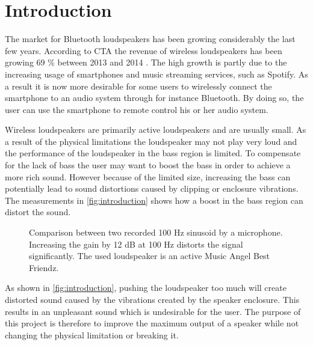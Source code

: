\chapter{Introduction}

The market for Bluetooth loudspeakers has been growing considerably the last few years. According to \gls{CTA} the revenue of wireless loudspeakers has been growing 69 \% between 2013 and 2014 \cite{sou:CTA}. The high growth is partly due to the increasing usage of smartphones and music streaming services, such as Spotify. As a result it is now more desirable for some users to wirelessly connect the smartphone to an audio system through for instance Bluetooth. By doing so, the user can use the smartphone to remote control his or her audio system. 

Wireless loudspeakers are primarily active loudspeakers and are usually small. As a result of the physical limitations the loudspeaker may not play very loud and the performance of the loudspeaker in the bass region is limited. To compensate for the lack of bass the user may want to boost the bass in order to achieve a more rich sound. However because of the limited size, increasing the bass can potentially lead to sound distortions caused by clipping or enclosure vibrations. The measurements in \autoref{fig:introduction} shows how a boost in the bass region can distort the sound.

\begin{figure}[H]
\centering
{}

\caption{Comparison between two recorded 100 Hz sinusoid by a microphone. Increasing the gain by 12 dB at 100 Hz distorts the signal significantly. The used loudspeaker is an active Music Angel Best Friendz.}
\label{fig:introduction}
\end{figure}
As shown in \autoref{fig:introduction}, pushing the loudspeaker too much will create distorted sound caused by the vibrations created by the speaker enclosure. This results in an unpleasant sound which is undesirable for the user. The purpose of this project is therefore to improve the maximum output of a speaker while not changing the physical limitation or breaking it. 


